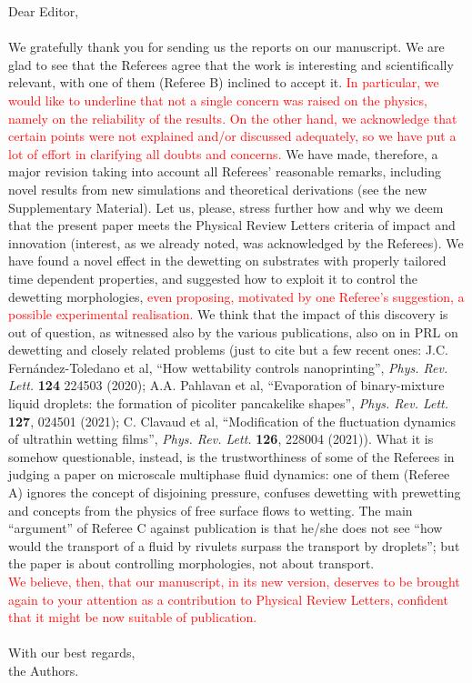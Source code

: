 \documentclass[12pt,english]{article}
\begin{document}
\noindent Dear Editor,\\
\\
\noindent We gratefully thank you for sending us the reports on our manuscript. We are glad to see 
that the Referees agree that the work is interesting and scientifically relevant, with one of them 
(Referee B) inclined to accept it. 
\textcolor{red}{In particular, we would like to underline that not a single 
concern was raised on the physics, namely on the reliability of the results.
On the other hand, we acknowledge that certain points were not explained and/or discussed adequately, so we have put a lot of effort in clarifying all
doubts and concerns.}
We have made, therefore, a major revision taking into account all Referees' reasonable remarks, including novel 
results from new simulations and theoretical derivations (see the new Supplementary Material).
Let us, please, stress further how and why we deem that the present paper meets the Physical
Review Letters criteria of impact and innovation (interest, as we already noted, was acknowledged by the Referees).
We have found a novel effect in the dewetting on substrates with properly tailored time dependent properties, and 
suggested how to exploit it to control the dewetting morphologies, 
\textcolor{red}{even proposing, motivated by one Referee's suggestion, a possible experimental realisation.}
We think that the impact of this discovery is out of question, as witnessed also by the various publications, also on in PRL on dewetting and closely related problems
(just to cite but a few recent ones: J.C. Fern\'andez-Toledano et al, ``How wettability controls nanoprinting'',
{\it Phys. Rev. Lett.} {\bf 124} 224503 (2020); A.A. Pahlavan et al,
``Evaporation of binary-mixture liquid droplets: the formation of picoliter pancakelike shapes'', {\it Phys. Rev. Lett.} {\bf 127}, 024501 (2021); 
C. Clavaud et al, ``Modification of the fluctuation dynamics of ultrathin wetting films'', {\it Phys. Rev. Lett.} {\bf 126}, 228004 (2021)).
What it is somehow questionable, instead, is the trustworthiness of some of the Referees in judging a paper on microscale multiphase fluid dynamics: one of 
them (Referee A) ignores the concept of disjoining pressure, confuses dewetting with prewetting and concepts from the physics of free surface flows to wetting.
The main ``argument'' of Referee C against publication is that he/she does not see ``how would the transport of a fluid by rivulets 
surpass the transport by droplets''; but the paper is about controlling morphologies, not about transport.\\
\textcolor{red}{We believe, then, that our manuscript, in its new version, deserves to be brought again to your attention as a contribution to Physical Review Letters, 
confident that it might be now suitable of publication.}\\
\\
With our best regards,\\
the Authors.
\end{document}
